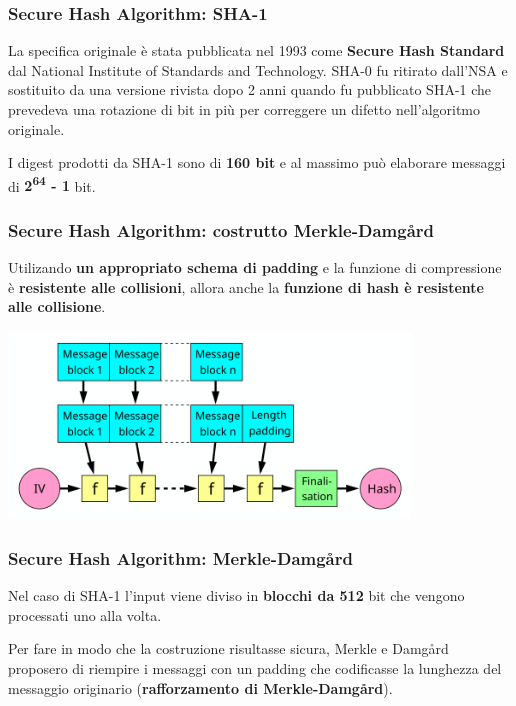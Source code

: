 \begin{frame}
	\frametitle{Secure Hash Algorithm: SHA-1}

	La specifica originale è stata pubblicata nel 1993 come \textbf{Secure Hash Standard} dal National Institute of Standards and Technology.
	SHA-0 fu ritirato dall'NSA e sostituito da una versione rivista dopo 2 anni quando fu pubblicato SHA-1 che prevedeva una rotazione di bit in più
	per correggere un difetto nell'algoritmo originale.

	\vspace{1cm}

	I digest prodotti da SHA-1 sono di \textbf{160 bit} e al massimo può elaborare messaggi di \textbf{2\textsuperscript{64} - 1} bit.
\end{frame}


\begin{frame}
	\frametitle{Secure Hash Algorithm: costrutto Merkle-Damgård}
	Utilizando \textbf{un appropriato schema di padding} e la funzione di compressione è \textbf{resistente alle collisioni}, allora anche la \textbf{funzione di hash è resistente alle collisione}.

	\begin{center}
		\includegraphics[width=0.8\textwidth]{img/1-img/Merkle-Damgard.png}
	\end{center}
\end{frame}


\begin{frame}
	\frametitle{Secure Hash Algorithm: Merkle-Damgård}

	Nel caso di SHA-1 l'input viene diviso in \textbf{blocchi da 512} bit che vengono processati uno alla volta.

	\vspace{1cm}


	Per fare in modo che la costruzione risultasse sicura, Merkle e Damgård proposero di
	riempire i messaggi con un padding che codificasse la lunghezza del messaggio originario (\textbf{rafforzamento di Merkle-Damgård}).
\end{frame}

